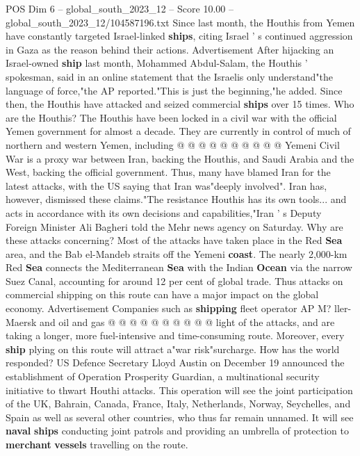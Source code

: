 \begin{textsample}{POS Dim 6 – global\_south\_2023\_12 – Score 10.00 – global\_south\_2023\_12/104587196.txt}
Since last month, the Houthis from Yemen have constantly targeted Israel-linked \textbf{ships}, citing Israel ' s continued aggression in Gaza as the reason behind their actions.
Advertisement After hijacking an Israel-owned \textbf{ship} last month, Mohammed Abdul-Salam, the Houthis ' spokesman, said in an online statement that the Israelis only understand"the language of force,"the AP reported."This is just the beginning,"he added.
Since then, the Houthis have attacked and seized commercial \textbf{ships} over 15 times.
Who are the Houthis?
The Houthis have been locked in a civil war with the official Yemen government for almost a decade.
They are currently in control of much of northern and western Yemen, including @ @ @ @ @ @ @ @ @ @ Yemeni Civil War is a proxy war between Iran, backing the Houthis, and Saudi Arabia and the West, backing the official government.
Thus, many have blamed Iran for the latest attacks, with the US saying that Iran was"deeply involved".
Iran has, however, dismissed these claims."The resistance Houthis has its own tools... and acts in accordance with its own decisions and capabilities,"Iran ' s Deputy Foreign Minister Ali Bagheri told the Mehr news agency on Saturday.
Why are these attacks concerning?
Most of the attacks have taken place in the Red \textbf{Sea} area, and the Bab el-Mandeb straits off the Yemeni \textbf{coast}.
The nearly 2,000-km Red \textbf{Sea} connects the Mediterranean \textbf{Sea} with the Indian \textbf{Ocean} via the narrow Suez Canal, accounting for around 12 per cent of global trade.
Thus attacks on commercial shipping on this route can have a major impact on the global economy.
Advertisement Companies such as \textbf{shipping} fleet operator AP M? ller-Maersk and oil and gas @ @ @ @ @ @ @ @ @ @ light of the attacks, and are taking a longer, more fuel-intensive and time-consuming route.
Moreover, every \textbf{ship} plying on this route will attract a"war risk"surcharge.
How has the world responded?
US Defence Secretary Lloyd Austin on December 19 announced the establishment of Operation Prosperity Guardian, a multinational security initiative to thwart Houthi attacks.
This operation will see the joint participation of the UK, Bahrain, Canada, France, Italy, Netherlands, Norway, Seychelles, and Spain as well as several other countries, who thus far remain unnamed.
It will see \textbf{naval} \textbf{ships} conducting joint patrols and providing an umbrella of protection to \textbf{merchant} \textbf{vessels} travelling on the route.

\end{textsample}
